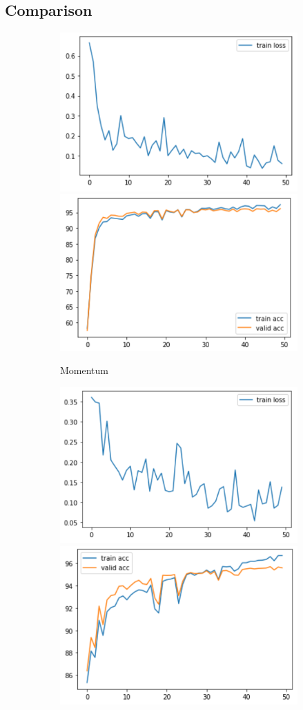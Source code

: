 \documentclass[11pt]{article}
\begin{document}
\subsection{Comparison}\label{optimization}
    \begin{figure}[H]
        \begin{subfigure}[H]{1\textwidth}
            \includegraphics[width=0.5\linewidth]{img/MLP/loss.PNG}
            \includegraphics[width=0.5\linewidth]{img/MLP/acc.PNG}
            \caption{Momentum}\vspace{2mm}
        \end{subfigure}
        \begin{subfigure}[H]{1\textwidth}
            \includegraphics[width=0.5\linewidth]{img/AdaGrad/loss.PNG}
            \includegraphics[width=0.5\linewidth]{img/AdaGrad/acc.PNG}

\end{subfigure}
\end{figure}
\end{document}
